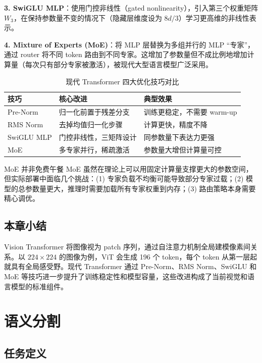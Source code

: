 \documentclass[a4paper]{article}
\begin{document}
\textbf{3. SwiGLU MLP}：使用门控非线性（gated nonlinearity），引入第三个权重矩阵 $W_3$，在保持参数量不变的情况下（隐藏层维度设为 $8d/3$）学习更高维的非线性表示。

\textbf{4. Mixture of Experts (MoE)}：将 MLP 层替换为多组并行的 MLP ``专家''，通过 router 将不同 token 路由到不同专家。这增加了参数量但不成比例地增加计算量（每次只有部分专家被激活），被现代大型语言模型广泛采用。

\begin{table}[H]
\centering
\begin{tabular}{p{3cm}p{4.5cm}p{5cm}}
\toprule
\textbf{技巧} & \textbf{核心改进} & \textbf{典型效果} \\
\midrule
Pre-Norm & 归一化前置于残差分支 & 训练更稳定，不需要 warm-up \\
RMS Norm & 去掉均值归一化步骤 & 计算更快，精度不降 \\
SwiGLU MLP & 门控非线性，三矩阵设计 & 同参数量下表达力更强 \\
MoE & 多专家并行，稀疏激活 & 参数量大增但计算量可控 \\
\bottomrule
\end{tabular}
\caption{现代 Transformer 四大优化技巧对比}
\end{table}

\begin{warningbox}{MoE 并非免费午餐}
MoE 虽然在理论上可以用固定计算量支撑更大的参数空间，但实际部署中面临几个挑战：(1) 专家负载不均衡可能导致部分专家过载；(2) 模型的总参数量更大，推理时需要加载所有专家权重到内存；(3) 路由策略本身需要精心调优。
\end{warningbox}

\subsection{本章小结}

Vision Transformer 将图像视为 patch 序列，通过自注意力机制全局建模像素间关系。以 $224 \times 224$ 的图像为例，ViT 会生成 196 个 token，每个 token 从第一层起就具有全局感受野。现代 Transformer 通过 Pre-Norm、RMS Norm、SwiGLU 和 MoE 等技巧进一步提升了训练稳定性和模型容量，这些改进构成了当前视觉和语言模型的标准组件。


\section{语义分割}

\subsection{任务定义}
\end{document}
